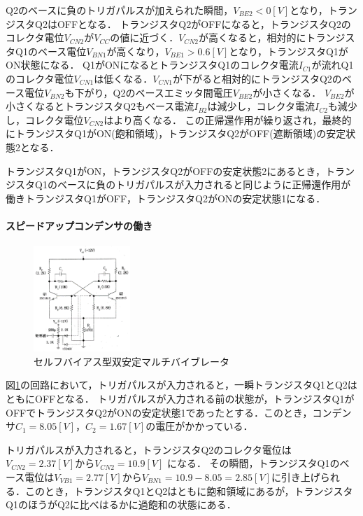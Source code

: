 \documentclass[10pt, a4j, dvipdfmx]{jarticle}
\begin{document}
    Q2のベースに負のトリガパルスが加えられた瞬間，$V_{BE2} < 0 [V]$となり，トランジスタQ2はOFFとなる．
    トランジスタQ2がOFFになると，トランジスタQ2のコレクタ電位$V_{CN2}$が$V_{CC}$の値に近づく．$V_{CN2}$が高くなると，相対的にトランジスタQ1のベース電位$V_{BN1}$が高くなり，$V_{BE1} > 0.6[V]$となり，トランジスタQ1がON状態になる．
    Q1がONになるとトランジスタQ1のコレクタ電流$I_{C1}$が流れQ1のコレクタ電位$V_{CN1}$は低くなる．$V_{CN1}$が下がると相対的にトランジスタQ2のベース電位$V_{BN2}$も下がり，Q2のベースエミッタ間電圧$V_{BE2}$が小さくなる．
    $V_{BE2}$が小さくなるとトランジスタQ2もベース電流$I_{B2}$は減少し，コレクタ電流$I_{C2}$も減少し，コレクタ電位$V_{CN2}$はより高くなる．
    この正帰還作用が繰り返され，最終的にトランジスタQ1がON(飽和領域)，トランジスタQ2がOFF(遮断領域)の安定状態2となる．

    トランジスタQ1がON，トランジスタQ2がOFFの安定状態2にあるとき，トランジスタQ1のベースに負のトリガパルスが入力されると同じように正帰還作用が働きトランジスタQ1がOFF，トランジスタQ2がONの安定状態1になる．

    \paragraph{スピードアップコンデンサの働き}
    \begin{figure}
        \vspace*{-\intextsep}
        \begin{center}
        \includegraphics[height=40mm]{images/fig-6.png}
        \caption{セルフバイアス型双安定マルチバイブレータ}
        \label{fig:6}
        \end{center}
    \end{figure}
    図\ref{fig:6}の回路において，トリガパルスが入力されると，一瞬トランジスタQ1とQ2はともにOFFとなる．
    トリガパルスが入力される前の状態が，トランジスタQ1がOFFでトランジスタQ2がONの安定状態1であったとする．このとき，コンデンサ$C_1 = 8.05[V]$，$C_2 = 1.67[V]$の電圧がかかっている．

    トリガパルスが入力されると，トランジスタQ2のコレクタ電位は$V_{CN2} = 2.37 [V]$から$V_{CN2} = 10.9 [V]$ になる．
    その瞬間，トランジスタQ1のベース電位は$V_{VB1} = 2.77 [V]$から$V_{BN1} = 10.9 - 8.05 = 2.85 [V]$に引き上げられる．このとき，トランジスタQ1とQ2はともに飽和領域にあるが，トランジスタQ1のほうがQ2に比べはるかに過飽和の状態にある．
\end{document}
